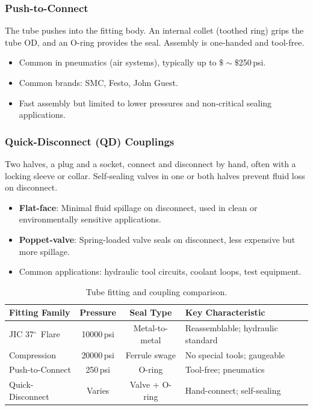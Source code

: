 \documentclass[11pt,letterpaper,twoside,openany]{book}
\begin{document}
\subsubsection{Push-to-Connect}

The tube pushes into the fitting body. An internal collet (toothed ring) grips the tube OD, and an O-ring provides the seal. Assembly is one-handed and tool-free.

\begin{itemize}[nosep,leftmargin=1.5em]
  \item Common in pneumatics (air systems), typically up to $\$\sim\$$250\,psi.
  \item Common brands: SMC, Festo, John Guest.
  \item Fast assembly but limited to lower pressures and non-critical sealing applications.
\end{itemize}

\subsubsection{Quick-Disconnect (QD) Couplings}

Two halves, a plug and a socket, connect and disconnect by hand, often with a locking sleeve or collar. Self-sealing valves in one or both halves prevent fluid loss on disconnect.

\begin{itemize}[nosep,leftmargin=1.5em]
  \item \textbf{Flat-face}: Minimal fluid spillage on disconnect, used in clean or environmentally sensitive applications.
  \item \textbf{Poppet-valve}: Spring-loaded valve seals on disconnect, less expensive but more spillage.
  \item Common applications: hydraulic tool circuits, coolant loops, test equipment.
\end{itemize}

\begin{table}[htbp]
\centering
\small
\begin{tabularx}{\textwidth}{l c c X}
  \toprule
  \textbf{Fitting Family} & \textbf{Pressure} & \textbf{Seal Type} & \textbf{Key Characteristic} \\
  \midrule
  JIC 37$^{\circ}$\ Flare & 10000\,psi & Metal-to-metal & Reassemblable; hydraulic standard \\
  Compression & 20000\,psi & Ferrule swage & No special tools; gaugeable \\
  Push-to-Connect & 250\,psi & O-ring & Tool-free; pneumatics \\
  Quick-Disconnect & Varies & Valve + O-ring & Hand-connect; self-sealing \\
  \bottomrule
\end{tabularx}
\caption{Tube fitting and coupling comparison.}
\end{table}
\end{document}
